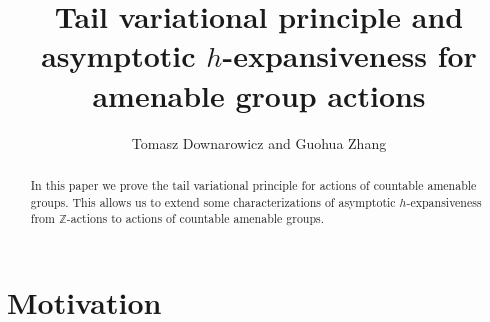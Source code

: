 \documentclass[12pt]{amsart}
\theoremstyle{definition}
\numberwithin{equation}{section}
\begin{document}
\title[Tail variational principle and asymptotic $h$-expansiveness]{Tail variational principle and asymptotic $h$-expansiveness for amenable group actions}


\author{Tomasz Downarowicz and Guohua Zhang}

\address{\vskip 2pt \hskip -12pt Tomasz Downarowicz}

\address{\hskip -12pt Faculty of Pure and Applied Mathematics, Wroc\l aw University of Science and Technology, Wybrze\.ze Wyspia\'nskiego 27, 50-370 Wroc\l aw, Poland}


\address{\vskip 2pt \hskip -12pt Guohua Zhang}

\address{\hskip -12pt School of Mathematical Sciences and Shanghai Center for Mathematical Sciences, Fudan University, Shanghai 200433, China}


\parindent=10pt
\begin{abstract}
In this paper we prove the tail variational principle for actions of countable amenable groups. This allows us to extend some characterizations of asymptotic $h$-expan\-si\-ve\-ness from $\mathbb{Z}$-actions to actions of countable amenable groups.
\end{abstract}

\maketitle

\setcounter{tocdepth}{2}

\section{Motivation}
\end{document}
